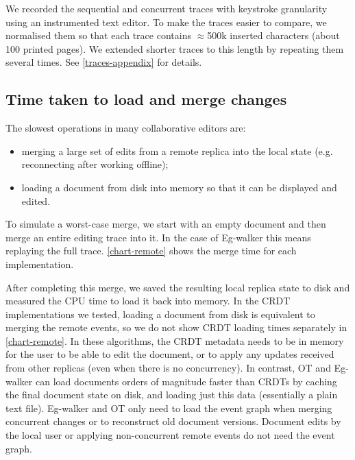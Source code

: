 \documentclass[sigplan,10pt]{acmart}
\newcommand{\algname}{Eg-walker\xspace}
\begin{document}
We recorded the sequential and concurrent traces with keystroke granularity using an instrumented text editor.
To make the traces easier to compare, we normalised them so that each trace contains $\approx$500k inserted characters (about 100 printed pages).
We extended shorter traces to this length by repeating them several times.
See \autoref{traces-appendix} for details.

\subsection{Time taken to load and merge changes}

The slowest operations in many collaborative editors are:
\begin{itemize}
\item merging a large set of edits from a remote replica into the local state (e.g. reconnecting after working offline);
\item loading a document from disk into memory so that it can be displayed and edited.
\end{itemize}
To simulate a worst-case merge, we start with an empty document and then merge an entire editing trace into it.
In the case of \algname this means replaying the full trace.
\autoref{chart-remote} shows the merge time for each implementation.

After completing this merge, we saved the resulting local replica state to disk and measured the CPU time to load it back into memory.
In the CRDT implementations we tested, loading a document from disk is equivalent to merging the remote events, so we do not show CRDT loading times separately in \autoref{chart-remote}.
In these algorithms, the CRDT metadata needs to be in memory for the user to be able to edit the document, or to apply any updates received from other replicas (even when there is no concurrency).
In contrast, OT and \algname can load documents orders of magnitude faster than CRDTs by caching the final document state on disk, and loading just this data (essentially a plain text file).
\algname and OT only need to load the event graph when merging concurrent changes or to reconstruct old document versions.
Document edits by the local user or applying non-concurrent remote events do not need the event graph.

\end{document}
